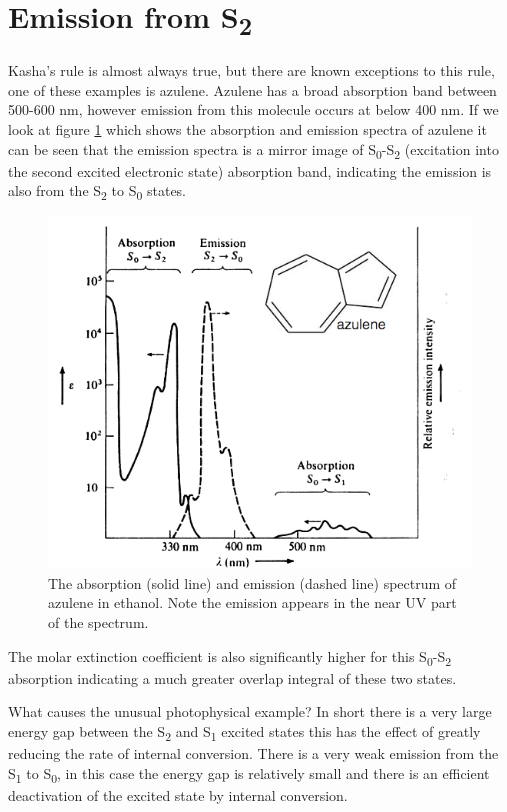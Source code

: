 \documentclass[
]{book}
\begin{document}
\hypertarget{sec:azuleneS2}{%
\section{\texorpdfstring{Emission from S\textsubscript{2}}{Emission from S2}}\label{sec:azuleneS2}}

Kasha's rule is almost always true, but there are known exceptions to this rule, one of these examples is azulene. Azulene has a broad absorption band between 500-600 nm, however emission from this molecule occurs at below 400 nm. If we look at figure \ref{fig:azulene} which shows the absorption and emission spectra of azulene it can be seen that the emission spectra is a mirror image of S\textsubscript{0}-S\textsubscript{2} (excitation into the second excited electronic state) absorption band, indicating the emission is also from the S\textsubscript{2} to S\textsubscript{0} states.

\begin{figure}

{\centering \includegraphics[width=0.6\linewidth]{images/azulene} 

}

\caption{The absorption (solid line) and emission (dashed line) spectrum of azulene in ethanol. Note the emission appears in the near UV part of the spectrum. }\label{fig:azulene}
\end{figure}

The molar extinction coefficient is also significantly higher for this S\textsubscript{0}-S\textsubscript{2} absorption indicating a much greater overlap integral of these two states.

What causes the unusual photophysical example? In short there is a very large energy gap between the S\textsubscript{2} and S\textsubscript{1} excited states this has the effect of greatly reducing the rate of internal conversion. There is a very weak emission from the S\textsubscript{1} to S\textsubscript{0}, in this case the energy gap is relatively small and there is an efficient deactivation of the excited state by internal conversion.
\end{document}
